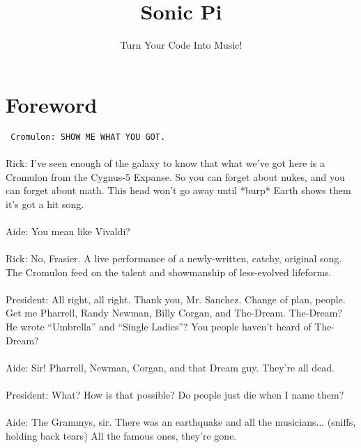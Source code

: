 \documentclass{42-en}
\begin{document}
\title{Sonic Pi}
\subtitle{Turn Your Code Into Music!}

\maketitle

\tableofcontents

\chapter{Foreword}
	\begin{scriptsize}
		{\setlength{\parindent}{0in}
		\texttt{
		\noindent
		Cromulon: SHOW ME WHAT YOU GOT.\\\\}
		Rick: I’ve seen enough of the galaxy to know that what we’ve got here is a Cromulon from the Cygnus-5 Expanse.		 So you can forget about nukes, and you can forget about math. This head won’t go away until *burp* Earth shows them it’s got a hit song.\\\\
		Aide: You mean like Vivaldi?\\\\
		Rick: No, Frasier. A live performance of a newly-written, catchy, original song. The Cromulon feed on the talent and showmanship of less-evolved lifeforms.\\\\
		President: All right, all right. Thank you, Mr. Sanchez. Change of plan, people. Get me Pharrell, Randy Newman, Billy Corgan, and The-Dream. The-Dream? He wrote “Umbrella” and “Single Ladies”? You people haven’t heard of The-Dream?\\\\
		Aide: Sir! Pharrell, Newman, Corgan, and that Dream guy. They’re all dead.\\\\
		President: What? How is that possible? Do people just die when I name them?\\\\
		Aide: The Grammys, sir. There was an earthquake and all the musicians... (sniffs, holding back tears) All the famous ones, they’re gone.\\\\
}
\end{scriptsize}
\end{document}
